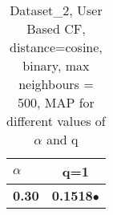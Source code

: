 \begin{table}
\begin{center}
\begin{tabular}{ | l || c |}
\hline
\textbf{$\alpha$} & \textbf{q=1} \\
\hline
\textbf{0.30} & \textbf{0.1518}$\bullet$\\
\hline
\end{tabular}
\caption{Dataset\_2, User Based CF, distance=cosine, binary, max neighbours = 500, MAP for different values of $\alpha$ and q}
\label{table:MAP_Dataset_2_ucf_cosine_binary_mnn=500}
\end{center}
\end{table}

